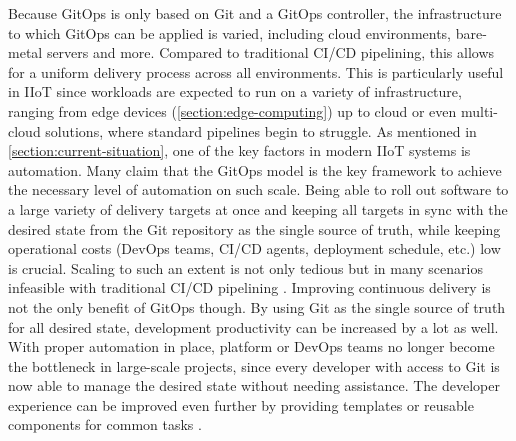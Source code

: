 
    Because GitOps is only based on Git and a GitOps controller, the infrastructure to which GitOps can be applied is varied, including cloud environments, bare-metal servers and more. Compared to traditional CI/CD pipelining, this allows for a uniform delivery process across all environments. This is particularly useful in IIoT since workloads are expected to run on a variety of infrastructure, ranging from edge devices (\autoref{section:edge-computing}) up to cloud or even multi-cloud solutions, where standard pipelines begin to struggle. As mentioned in \autoref{section:current-situation}, one of the key factors in modern IIoT systems is automation. Many claim that the GitOps model is the key framework to achieve the necessary level of automation on such scale. Being able to roll out software to a large variety of delivery targets at once and keeping all targets in sync with the desired state from the Git repository as the single source of truth, while keeping operational costs (DevOps teams, CI/CD agents, deployment schedule, etc.) low is crucial. Scaling to such an extent is not only tedious but in many scenarios infeasible with traditional CI/CD pipelining \cite{weaveworks_gitops_edge_all_clouds}. Improving continuous delivery is not the only benefit of GitOps though. By using Git as the single source of truth for all desired state, development productivity can be increased by a lot as well. With proper automation in place, platform or DevOps teams no longer become the bottleneck in large-scale projects, since every developer with access to Git is now able to manage the desired state without needing assistance. The developer experience can be improved even further by providing templates or reusable components for common tasks \cite{telekom_gitops_k8s_scale}.\newline

